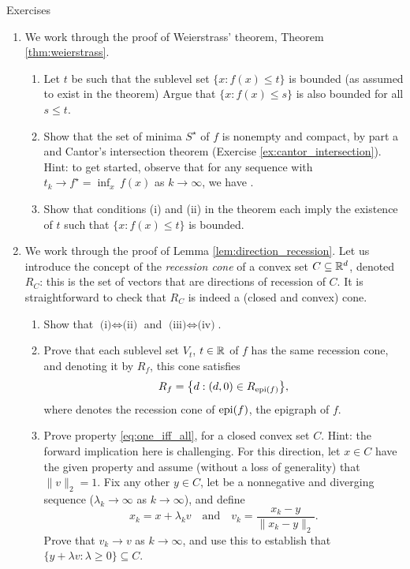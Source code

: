 \begin{xcb}{Exercises}
\begin{enumerate}[label=\thechapter.\arabic*]
\item \label{ex:weierstrass} 
  We work through the proof of Weierstrass' theorem, Theorem
  \ref{thm:weierstrass}. 

\begin{enumerate}[label=\alph*.]
\item Let $t$ be such that the sublevel set $\{x : f(x) \leq t\}$ is bounded (as
  assumed to exist in the theorem) Argue that $\{x : f(x) \leq s\}$ is also
  bounded for all $s \leq t$. 

\item Show that the set of minima $S^\star$ of $f$ is nonempty and compact,
  by part a and Cantor's intersection theorem (Exercise
  \ref{ex:cantor_intersection}). Hint: to get started, observe that for any 
  sequence  with $t_k \to f^\star = \inf_x \,
  f(x)$ as $k \to \infty$, we have .   

\item Show that conditions (i) and (ii) in the theorem each imply the existence
  of $t$ such that $\{x : f(x) \leq t\}$ is bounded. 
\end{enumerate}

\item \label{ex:direction_recession}
  We work through the proof of Lemma \ref{lem:direction_recession}. Let us
  introduce the concept of the \emph{recession cone} of a convex set $C
  \subseteq \mathbb{R}^d$, denoted $R_C$: this is the set of vectors that are directions
  of recession of $C$. It is straightforward to check that $R_C$ is indeed a
  (closed and convex) cone. 

\begin{enumerate}[label=\alph*.]
\item Show that $\text{(i)} \iff \text{(ii)}$ and $\text{(iii)} \iff
  \text{(iv)}$. 

\item Prove that each sublevel set $V_t$, $t \in \mathbb{R}$ of $f$ has the same
  recession cone, and denoting it by $R_f$, this cone satisfies 
  \[
  R_f = \big\{ d : (d,0) \in R_{\operatorname{epi}(f)} \big\},
  \]
  where  denotes the recession cone of $\operatorname{epi}(f)$, the
  epigraph of $f$. 

\item Prove property \eqref{eq:one_iff_all}, for a closed convex set $C$. Hint:
  the forward implication here is challenging. For this direction, let $x \in C$
  have the given property and assume (without a loss of generality) that
  $\|v\|_2 =  1$. Fix any other $y \in C$, let
   be a nonnegative and diverging sequence
  ($\lambda_k \to \infty$ as $k \to \infty$), and define 
  \[
  x_k = x + \lambda_k v \quad \text{and} \quad v_k = \frac{x_k - y}{\|x_k -
    y\|_2}. 
  \] 
  Prove that $v_k \to v$ as $k \to \infty$, and use this to establish that $\{y
  + \lambda v : \lambda \geq 0\} \subseteq C$. 


\end{enumerate}
\end{enumerate}
\end{xcb}
